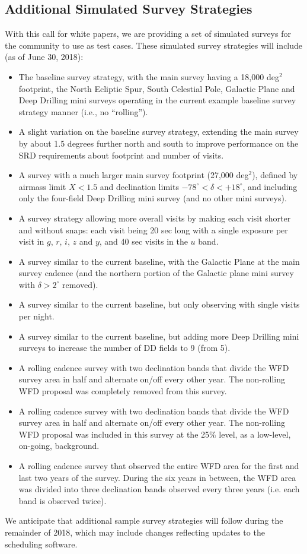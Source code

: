 \documentclass[DM,toc,usenatbib]{lsstdoc}
\begin{document}
\subsection{Additional Simulated Survey Strategies \label{sec:surveys}}

With this call for white papers, we are providing a set of
simulated surveys for the community to use as test cases. These simulated survey strategies will include (as of June 30, 2018): 
\begin{itemize}
\item The baseline survey strategy, with the main survey having a 18,000 deg$^2$ footprint, the North Ecliptic Spur, South Celestial Pole, Galactic Plane and Deep Drilling mini surveys operating in the current example baseline survey strategy manner (i.e., no ``rolling''). 
\item A slight variation on the baseline survey strategy, extending the main survey by about 1.5 degrees further north and south to improve performance on 
the SRD requirements about footprint and number of visits. 
\item A survey with a much larger main survey footprint (27,000 deg$^2$), defined by airmass limit $X<1.5$ and declination limits 
$-78^\circ< \delta < +18^\circ$, and including only the four-field Deep Drilling mini survey (and no other mini surveys).
\item A survey strategy allowing more overall visits by making each visit shorter and without snaps: each visit being 20 sec long with a single exposure per visit in $g$, $r$, $i$, $z$ and $y$, and 40 sec visits in the $u$ band.  
\item A survey similar to the current baseline, with the Galactic Plane at the main survey cadence (and the northern portion of the Galactic plane mini survey with $\delta>2^\circ$ removed).
\item A survey similar to the current baseline, but only observing with single visits per night.
\item A survey similar to the current baseline, but adding more Deep Drilling mini surveys to increase the number of DD fields to 9 (from 5). 
\item A rolling cadence survey with two declination bands that divide the WFD survey area in half and alternate on/off every other year. The non-rolling WFD proposal was completely removed from this survey.
\item A rolling cadence survey with two declination bands that divide the WFD survey area in half and alternate on/off every other year. The non-rolling WFD proposal was included in this survey at the 25$\%$ level, as a low-level, on-going, background. 
\item A rolling cadence survey that observed the entire WFD area for the first and last two years of the survey. During the six years in between, the WFD area was divided into three declination bands observed every three years (i.e. each band is observed twice).
\end{itemize}
We anticipate that additional sample survey strategies will follow during the remainder of 2018, which may include changes reflecting updates to the scheduling software.
\end{document}
